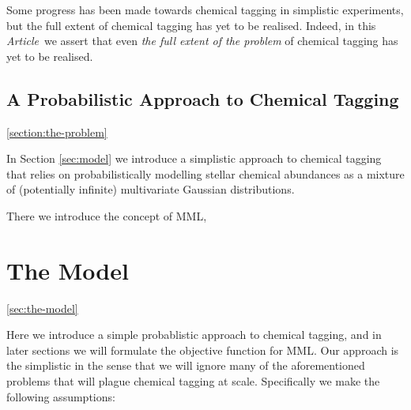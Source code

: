 \documentclass{aastex61}
\newcommand{\article}{\emph{Article}}
\begin{document}
Some progress has been made towards chemical tagging in simplistic experiments, 
but the full extent of chemical tagging has yet to be realised. Indeed, in this 
\article\ we assert that even \emph{the full extent of the problem} of chemical 
tagging has yet to be realised. 

\subsection*{A Probabilistic Approach to Chemical Tagging}
\ref{section:the-problem}







In Section \ref{sec:model} we introduce a simplistic approach to chemical
tagging that relies on probabilistically modelling stellar chemical abundances
as a mixture of (potentially infinite) multivariate Gaussian distributions.

There we introduce the concept of MML,


\section{The Model}
\ref{sec:the-model}

Here we introduce a simple probablistic approach to chemical tagging, and in
later sections we will formulate the objective function for MML. Our approach is
the simplistic in the sense that we will ignore many of the aforementioned
problems that will plague chemical tagging at scale. Specifically we make the
following assumptions:
\end{document}

